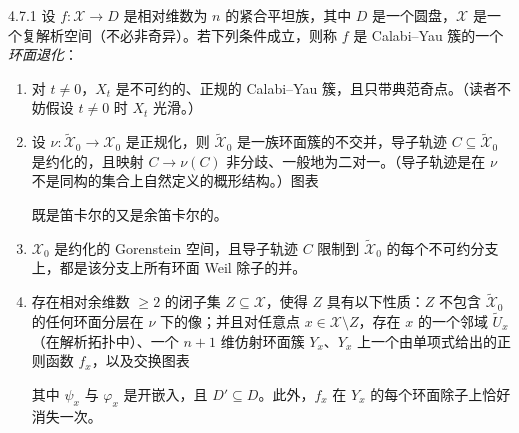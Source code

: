 \begin{definition}{4.7.1}
设 $f:\mathcal{X}\to D$ 是相对维数为 $n$ 的紧合平坦族，其中 $D$ 是一个圆盘，$\mathcal{X}$ 是一个复解析空间（不必非奇异）。若下列条件成立，则称 $f$ 是 Calabi--Yau 簇的一个\emph{环面退化}：
\begin{enumerate}
\item 对 $t\neq 0$，$X_t$ 是不可约的、正规的 Calabi--Yau 簇，且只带典范奇点。（读者不妨假设 $t\neq 0$ 时 $X_t$ 光滑。）
\item 设 $\nu:\widetilde{\mathcal{X}}_0\to\mathcal{X}_0$ 是正规化，则 $\widetilde{\mathcal{X}}_0$ 是一族环面簇的不交并，导子轨迹 $C\subseteq\widetilde{\mathcal{X}}_0$ 是约化的，且映射 $C\to\nu(C)$ 非分歧、一般地为二对一。（导子轨迹是在 $\nu$ 不是同构的集合上自然定义的概形结构。）图表
\begin{center}
\end{center}
既是笛卡尔的又是余笛卡尔的。
\item $\mathcal{X}_0$ 是约化的 Gorenstein 空间，且导子轨迹 $C$ 限制到 $\widetilde{\mathcal{X}}_0$ 的每个不可约分支上，都是该分支上所有环面 Weil 除子的并。
\item 存在相对余维数 $\ge 2$ 的闭子集 $Z\subseteq\mathcal{X}$，使得 $Z$ 具有以下性质：$Z$ 不包含 $\widetilde{\mathcal{X}}_0$ 的任何环面分层在 $\nu$ 下的像；并且对任意点 $x\in\mathcal{X}\setminus Z$，存在 $x$ 的一个邻域 $\widetilde{U}_x$（在解析拓扑中）、一个 $n+1$ 维仿射环面簇 $Y_x$、$Y_x$ 上一个由单项式给出的正则函数 $f_x$，以及交换图表
\begin{center}
\end{center}
其中 $\psi_x$ 与 $\varphi_x$ 是开嵌入，且 $D'\subseteq D$。此外，$f_x$ 在 $Y_x$ 的每个环面除子上恰好消失一次。
\end{enumerate}
\end{definition}

